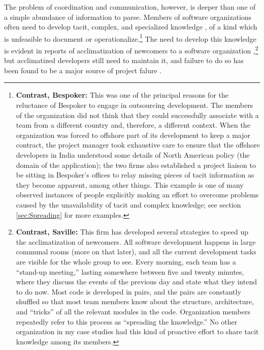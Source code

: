 The problem of coordination and communication, however, is deeper than one of a simple abundance of information to parse. Members of software organizations often need to develop tacit, complex, and specialized knowledge \cite{Schon1984}, of a kind which is unfeasible to document or operationalize.\footnote{\textbf{Contrast, Bespoker:} This was one of the principal reasons for the reluctance of Bespoker to engage in outsourcing development. The members of the organization did not think that they could successfully associate with a team from a different country and, therefore, a different context. When the organization was forced to offshore part of its development to keep a major contract, the project manager took exhaustive care to ensure that the offshore developers in India understood some details of North American policy (the domain of the application); the two firms also established a project liaison to be sitting in Bespoker's offices to relay missing pieces of tacit information as they become apparent, among other things. This example is one of many observed instances of people explicitly making an effort to overcome problems caused by the unavailability of tacit and complex knowledge; see section \ref{sec:Spreading} for more examples.} The need to develop this knowledge is evident in reports of acclimatization of newcomers to a software organization \cite{Sim1998,Begel2008},\footnote{\textbf{Contrast, Saville:} This firm has developed several strategies to speed up the acclimatization of newcomers. All software development happens in large communal rooms (more on that later), and all the current development tasks are visible for the whole group to see. Every morning, each team has a ``stand-up meeting,'' lasting somewhere between five and twenty minutes, where they discuss the events of the previous day and state what they intend to do now. Most code is developed in pairs, and the pairs are constantly shuffled so that most team members know about the structure, architecture, and ``tricks'' of all the relevant modules in the code. Organization members repeatedly refer to this process as ``spreading the knowledge.'' No other organization in my case studies had this kind of proactive effort to share tacit knowledge among its members.} but acclimatized developers still need to maintain it, and failure to do so has been found to be a major source of project falure \cite{Herbsleb1999}.

